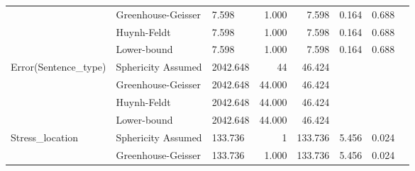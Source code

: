 \documentclass[a4paper]{article}
\begin{document}
\begin{table}[H]
\begin{tabular}{p{}p{}|l|r|r|r|r|r|}
\cline{2-7}
                                                        & Greenhouse-Geisser & 7.598                                        & 1.000                   & 7.598                            & 0.164                  & 0.688                      \\ 
\cline{2-7}
                                                        & Huynh-Feldt        & 7.598                                        & 1.000                   & 7.598                            & 0.164                  & 0.688                      \\ 
\cline{2-7}
                                                        & Lower-bound        & 7.598                                        & 1.000                   & 7.598                            & 0.164                  & 0.688                      \\ 
\hline
\multirow{4}{*}{Error(Sentence\_type)}                  & Sphericity Assumed & 2042.648                                     & 44                      & 46.424                           & \multicolumn{1}{l|}{~} & \multicolumn{1}{l|}{~}     \\ 
\cline{2-7}
                                                        & Greenhouse-Geisser & 2042.648                                     & 44.000                  & 46.424                           & \multicolumn{1}{l|}{~} & \multicolumn{1}{l|}{~}     \\ 
\cline{2-7}
                                                        & Huynh-Feldt        & 2042.648                                     & 44.000                  & 46.424                           & \multicolumn{1}{l|}{~} & \multicolumn{1}{l|}{~}     \\ 
\cline{2-7}
                                                        & Lower-bound        & 2042.648                                     & 44.000                  & 46.424                           & \multicolumn{1}{l|}{~} & \multicolumn{1}{l|}{~}     \\ 
\hline
\multirow{4}{*}{Stress\_location}                       & Sphericity Assumed & 133.736                                      & 1                       & 133.736                          & 5.456                  & 0.024                      \\ 
\cline{2-7}
                                                        & Greenhouse-Geisser & 133.736                                      & 1.000                   & 133.736                          & 5.456                  & 0.024                      \\ 

\end{tabular}
\end{table}
\end{document}
